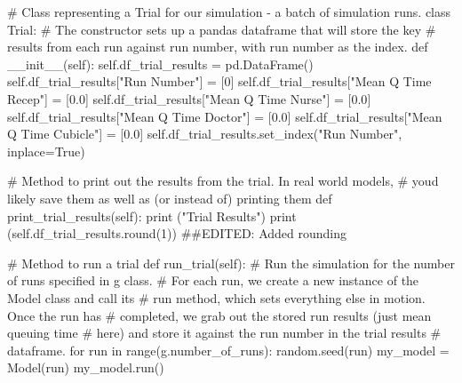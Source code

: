 \documentclass[
  letterpaper,
  DIV=11,
  numbers=noendperiod]{scrreprt}
\newenvironment{Shaded}{\begin{snugshade}}{\end{snugshade}}
\newcommand{\BuiltInTok}[1]{\textcolor[rgb]{0.00,0.23,0.31}{#1}}
\newcommand{\CommentTok}[1]{\textcolor[rgb]{0.37,0.37,0.37}{#1}}
\newcommand{\ControlFlowTok}[1]{\textcolor[rgb]{0.00,0.23,0.31}{#1}}
\newcommand{\DecValTok}[1]{\textcolor[rgb]{0.68,0.00,0.00}{#1}}
\newcommand{\FloatTok}[1]{\textcolor[rgb]{0.68,0.00,0.00}{#1}}
\newcommand{\FunctionTok}[1]{\textcolor[rgb]{0.28,0.35,0.67}{#1}}
\newcommand{\KeywordTok}[1]{\textcolor[rgb]{0.00,0.23,0.31}{#1}}
\newcommand{\NormalTok}[1]{\textcolor[rgb]{0.00,0.23,0.31}{#1}}
\newcommand{\OperatorTok}[1]{\textcolor[rgb]{0.37,0.37,0.37}{#1}}
\newcommand{\StringTok}[1]{\textcolor[rgb]{0.13,0.47,0.30}{#1}}
\newcommand{\VariableTok}[1]{\textcolor[rgb]{0.07,0.07,0.07}{#1}}
\begin{document}
\begin{Shaded}
\begin{Highlighting}[]
\CommentTok{\# Class representing a Trial for our simulation {-} a batch of simulation runs.}
\KeywordTok{class}\NormalTok{ Trial:}
    \CommentTok{\# The constructor sets up a pandas dataframe that will store the key}
    \CommentTok{\# results from each run against run number, with run number as the index.}
    \KeywordTok{def}  \FunctionTok{\_\_init\_\_}\NormalTok{(}\VariableTok{self}\NormalTok{):}
        \VariableTok{self}\NormalTok{.df\_trial\_results }\OperatorTok{=}\NormalTok{ pd.DataFrame()}
        \VariableTok{self}\NormalTok{.df\_trial\_results[}\StringTok{"Run Number"}\NormalTok{] }\OperatorTok{=}\NormalTok{ [}\DecValTok{0}\NormalTok{]}
        \VariableTok{self}\NormalTok{.df\_trial\_results[}\StringTok{"Mean Q Time Recep"}\NormalTok{] }\OperatorTok{=}\NormalTok{ [}\FloatTok{0.0}\NormalTok{]}
        \VariableTok{self}\NormalTok{.df\_trial\_results[}\StringTok{"Mean Q Time Nurse"}\NormalTok{] }\OperatorTok{=}\NormalTok{ [}\FloatTok{0.0}\NormalTok{]}
        \VariableTok{self}\NormalTok{.df\_trial\_results[}\StringTok{"Mean Q Time Doctor"}\NormalTok{] }\OperatorTok{=}\NormalTok{ [}\FloatTok{0.0}\NormalTok{]}
        \VariableTok{self}\NormalTok{.df\_trial\_results[}\StringTok{"Mean Q Time Cubicle"}\NormalTok{] }\OperatorTok{=}\NormalTok{ [}\FloatTok{0.0}\NormalTok{]}
        \VariableTok{self}\NormalTok{.df\_trial\_results.set\_index(}\StringTok{"Run Number"}\NormalTok{, inplace}\OperatorTok{=}\VariableTok{True}\NormalTok{)}

    \CommentTok{\# Method to print out the results from the trial.  In real world models,}
    \CommentTok{\# you\textquotesingle{}d likely save them as well as (or instead of) printing them}
    \KeywordTok{def}\NormalTok{ print\_trial\_results(}\VariableTok{self}\NormalTok{):}
        \BuiltInTok{print}\NormalTok{ (}\StringTok{"Trial Results"}\NormalTok{)}
        \BuiltInTok{print}\NormalTok{ (}\VariableTok{self}\NormalTok{.df\_trial\_results.}\BuiltInTok{round}\NormalTok{(}\DecValTok{1}\NormalTok{)) }\CommentTok{\#\#EDITED: Added rounding}

    \CommentTok{\# Method to run a trial}
    \KeywordTok{def}\NormalTok{ run\_trial(}\VariableTok{self}\NormalTok{):}
        \CommentTok{\# Run the simulation for the number of runs specified in g class.}
        \CommentTok{\# For each run, we create a new instance of the Model class and call its}
        \CommentTok{\# run method, which sets everything else in motion.  Once the run has}
        \CommentTok{\# completed, we grab out the stored run results (just mean queuing time}
        \CommentTok{\# here) and store it against the run number in the trial results}
        \CommentTok{\# dataframe.}
        \ControlFlowTok{for}\NormalTok{ run }\KeywordTok{in} \BuiltInTok{range}\NormalTok{(g.number\_of\_runs):}
\NormalTok{            random.seed(run)}
\NormalTok{            my\_model }\OperatorTok{=}\NormalTok{ Model(run)}
\NormalTok{            my\_model.run()}


\end{Highlighting}
\end{Shaded}
\end{document}
